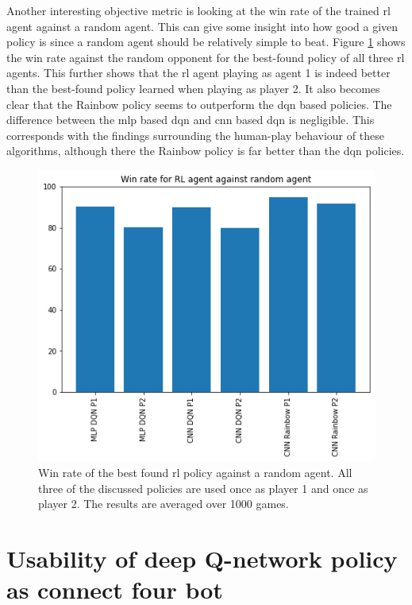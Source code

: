 Another interesting objective metric is looking at the win rate of the trained \gls{rl} agent against a random agent.
This can give some insight into how good a given policy is since a random agent should be relatively simple to beat.
Figure \ref{fig:win_rate_random} shows the win rate against the random opponent for the best-found policy of all three \gls{rl} agents.
This further shows that the \gls{rl} agent playing as agent 1 is indeed better than the best-found policy learned when playing as player 2.
It also becomes clear that the Rainbow policy seems to outperform the \gls{dqn} based policies.
The difference between the \gls{mlp} based \gls{dqn} and \gls{cnn} based \gls{dqn} is negligible.
This corresponds with the findings surrounding the human-play behaviour of these algorithms, although there the Rainbow policy is far better than the \gls{dqn} policies.

\begin{figure}[ht]
    \centering
    \includegraphics[width=0.7\linewidth]{images/rl_vs_random.png}
    \captionsetup{width=0.9\linewidth}
    \captionsetup{justification=centering}
    \caption{Win rate of the best found \gls{rl} policy against a random agent. All three of the discussed policies are used once as player 1 and once as player 2. The results are averaged over 1000 games.}
    \label{fig:win_rate_random}
\end{figure}





\section{Usability of deep Q-network policy as connect four bot}
\label{sec:connect_four_eval-dqn_vs_human}

